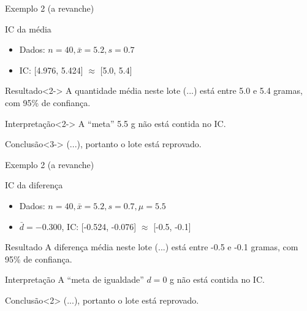 \documentclass{beamer}
\begin{document}
\begin{frame}{\scriptsize Exemplo 2 (a revanche)}
  \begin{exampleblock}{IC da média}
    \footnotesize
    \begin{itemize}
      \scriptsize
    \item Dados: $n=40, \bar{x} = 5.2, s = 0.7$
    \item IC: [4.976, 5.424] $\approx$ [5.0, 5.4]
    \end{itemize}
  \end{exampleblock}
  \begin{exampleblock}{Resultado}<2->
    \footnotesize
    A quantidade média neste lote (...)
    está entre 5.0 e 5.4 gramas, com 95\% de confiança.
  \end{exampleblock}
  \begin{block}{Interpretação}<2->
    \footnotesize
    A ``meta'' 5.5 g não está contida no IC.
  \end{block}
  \begin{exampleblock}{Conclusão}<3->
    \footnotesize
    (...), portanto o lote está reprovado.
  \end{exampleblock}
\end{frame}

\begin{frame}{\scriptsize Exemplo 2 (a revanche)}
  \begin{exampleblock}{IC da diferença}
    \footnotesize
    \begin{itemize}
      \scriptsize
    \item Dados: $n=40, \bar{x} = 5.2, s = 0.7, \mu = 5.5$
    \item $\bar{d} = -0.300$, IC: [-0.524, -0.076] $\approx$ [-0.5, -0.1]
    \end{itemize}
  \end{exampleblock}
  \begin{exampleblock}{Resultado}
    \footnotesize
    A diferença média neste lote (...)
    está entre -0.5 e -0.1 gramas, com 95\% de confiança.
  \end{exampleblock}
  \begin{block}{Interpretação}
    \footnotesize
    A ``meta de igualdade'' $d = 0$ g não está contida no IC.
  \end{block}
  \begin{exampleblock}{Conclusão}<2>
    \footnotesize
    (...), portanto o lote está reprovado.
  \end{exampleblock}
\end{frame}
\end{document}
